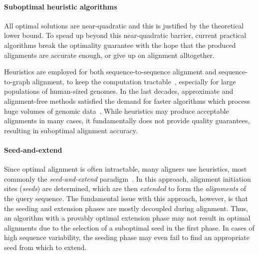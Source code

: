 \paragraph{Suboptimal heuristic algorithms}
All optimal solutions are near-quadratic and this is justified by the
theoretical lower bound. To spead up beyond this near-quadratic barrier, current
practical algorithms break the optimality guarantee with the hope that the
produced alignments are accurate enough, or give up on alignment alltogether.

Heuristics are employed for both sequence-to-sequence alignment and
sequence-to-graph alignment, to keep the computation
tractable~\cite{altschul_basic_1990,langmead_fast_2012,garrison_variation_2018},
especially for large populations of human-sized genomes. In the last decades,
approximate and alignment-free methods satisfied the demand for faster
algorithms which process huge volumes of genomic
data~\citep{kucherov2019evolution}. While heuristics may produce acceptable
alignments in many cases, it fundamentally does not provide quality guarantees,
resulting in suboptimal alignment accuracy.

\paragraph{Seed-and-extend}
Since optimal alignment is often intractable, many aligners use heuristics, most
commonly the \emph{seed-and-extend}
paradigm~\cite{altschul_basic_1990,langmead_fast_2012,li_fast_2009}. In this
approach, alignment initiation sites (\emph{seeds}) are determined, which are
then \emph{extended} to form the \emph{alignments} of the query sequence. The
fundamental issue with this approach, however, is that the seeding and extension
phases are mostly decoupled during alignment. Thus, an algorithm with a provably
optimal extension phase may not result in optimal alignments due to the
selection of a suboptimal seed in the first phase. In cases of high sequence
variability, the seeding phase may even fail to find an appropriate seed from
which to extend.


